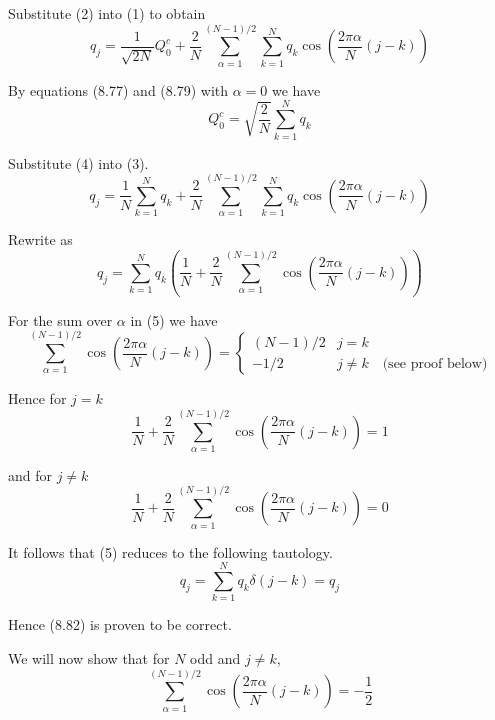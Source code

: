 Substitute (2) into (1) to obtain
\begin{equation*}
q_j=
\frac{1}{\sqrt{2N}}Q_0^c
+
\frac{2}{N}
\sum_{\alpha=1}^{(N-1)/2}
\sum_{k=1}^N
q_k\cos\left(\frac{2\pi\alpha}{N}(j-k)\right)
\tag{3}
\end{equation*}

By equations (8.77) and (8.79) with $\alpha=0$ we have
\begin{equation*}
Q_0^c
=\sqrt{\frac{2}{N}}\sum_{k=1}^Nq_k
\tag{4}
\end{equation*}

Substitute (4) into (3).
\begin{equation*}
q_j=
\frac{1}{N}\sum_{k=1}^N q_k
+
\frac{2}{N}
\sum_{\alpha=1}^{(N-1)/2}
\sum_{k=1}^N
q_k\cos\left(\frac{2\pi\alpha}{N}(j-k)\right)
\end{equation*}

Rewrite as
\begin{equation*}
q_j=\sum_{k=1}^N q_k \left(
\frac{1}{N}+\frac{2}{N}\sum_{\alpha=1}^{(N-1)/2}
\cos\left(\frac{2\pi\alpha}{N}(j-k)\right)
\right)
\tag{5}
\end{equation*}

For the sum over $\alpha$ in (5) we have
\begin{equation*}
\sum_{\alpha=1}^{(N-1)/2}
\cos\left(\frac{2\pi\alpha}{N}(j-k)\right)
=\begin{cases}
(N-1)/2 & j=k
\\
-1/2 & j\ne k\quad\text{(see proof below)}
\end{cases}
\end{equation*}

Hence for $j=k$
\begin{equation*}
\frac{1}{N}+\frac{2}{N}\sum_{\alpha=1}^{(N-1)/2}
\cos\left(\frac{2\pi\alpha}{N}(j-k)\right)
=1
\end{equation*}

and for $j\ne k$
\begin{equation*}
\frac{1}{N}+\frac{2}{N}\sum_{\alpha=1}^{(N-1)/2}
\cos\left(\frac{2\pi\alpha}{N}(j-k)\right)
=0
\end{equation*}

It follows that (5) reduces to the following tautology.
\begin{equation*}
q_j=\sum_{k=1}^N q_k\delta(j-k)=q_j
\end{equation*}

Hence (8.82) is proven to be correct.

\bigskip
We will now show that for $N$ odd and $j\ne k$,
\begin{equation*}
\sum_{\alpha=1}^{(N-1)/2}
\cos\left(\frac{2\pi\alpha}{N}(j-k)\right)
=-\frac{1}{2}
\end{equation*}

